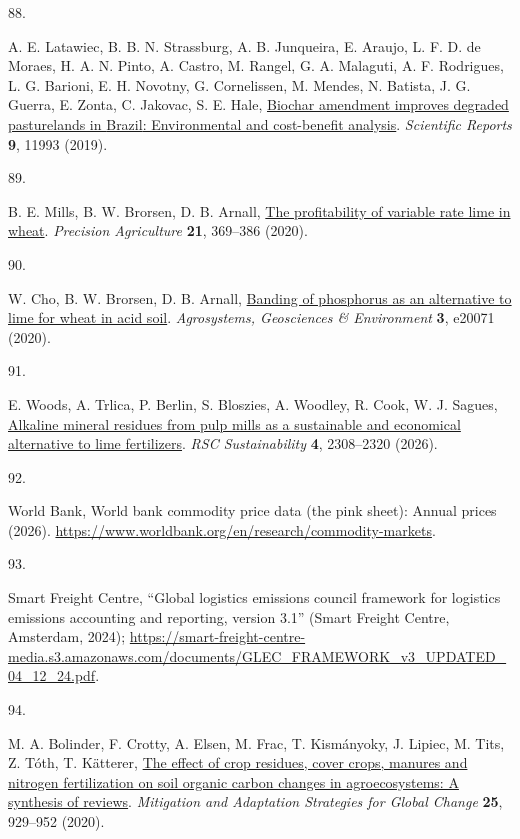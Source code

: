 \documentclass[
  letterpaper,
]{article}
\newlength{\cslhangindent}
\newlength{\csllabelwidth}
\newenvironment{CSLReferences}[2] %
 {\begin{list}{}{%
  \setlength{\itemindent}{0pt}
  \setlength{\leftmargin}{0pt}
  \setlength{\parsep}{0pt}
  \ifodd #1
   \setlength{\leftmargin}{\cslhangindent}
   \setlength{\itemindent}{-1\cslhangindent}
  \fi
  \setlength{\itemsep}{#2\baselineskip}}}
 {\end{list}}
\newcommand{\CSLLeftMargin}[1]{\parbox[t]{\csllabelwidth}{\strut#1\strut}}
\newcommand{\CSLRightInline}[1]{\parbox[t]{\linewidth - \csllabelwidth}{\strut#1\strut}}
\begin{document}
\begin{CSLReferences}{0}{1}
\CSLLeftMargin{88. }%
\CSLRightInline{A. E. Latawiec, B. B. N. Strassburg, A. B. Junqueira, E.
Araujo, L. F. D. de Moraes, H. A. N. Pinto, A. Castro, M. Rangel, G. A.
Malaguti, A. F. Rodrigues, L. G. Barioni, E. H. Novotny, G. Cornelissen,
M. Mendes, N. Batista, J. G. Guerra, E. Zonta, C. Jakovac, S. E. Hale,
\href{https://doi.org/10.1038/s41598-019-47647-x}{Biochar amendment
improves degraded pasturelands in {Brazil}: Environmental and
cost-benefit analysis}. \emph{Scientific Reports} \textbf{9}, 11993
(2019).}

\CSLLeftMargin{89. }%
\CSLRightInline{B. E. Mills, B. W. Brorsen, D. B. Arnall,
\href{https://doi.org/10.1007/s11119-019-09674-6}{The profitability of
variable rate lime in wheat}. \emph{Precision Agriculture} \textbf{21},
369--386 (2020).}

\CSLLeftMargin{90. }%
\CSLRightInline{W. Cho, B. W. Brorsen, D. B. Arnall,
\href{https://doi.org/10.1002/agg2.20071}{Banding of phosphorus as an
alternative to lime for wheat in acid soil}. \emph{Agrosystems,
Geosciences \& Environment} \textbf{3}, e20071 (2020).}

\CSLLeftMargin{91. }%
\CSLRightInline{E. Woods, A. Trlica, P. Berlin, S. Bloszies, A. Woodley,
R. Cook, W. J. Sagues,
\href{https://doi.org/10.1039/d5su00814j}{Alkaline mineral residues from
pulp mills as a sustainable and economical alternative to lime
fertilizers}. \emph{RSC Sustainability} \textbf{4}, 2308--2320 (2026).}

\CSLLeftMargin{92. }%
\CSLRightInline{World Bank, World bank commodity price data (the pink
sheet): Annual prices (2026).
\url{https://www.worldbank.org/en/research/commodity-markets}.}

\CSLLeftMargin{93. }%
\CSLRightInline{Smart Freight Centre, {``Global logistics emissions
council framework for logistics emissions accounting and reporting,
version 3.1''} (Smart Freight Centre, Amsterdam, 2024);
\url{https://smart-freight-centre-media.s3.amazonaws.com/documents/GLEC_FRAMEWORK_v3_UPDATED_04_12_24.pdf}.}

\CSLLeftMargin{94. }%
\CSLRightInline{M. A. Bolinder, F. Crotty, A. Elsen, M. Frac, T.
Kismányoky, J. Lipiec, M. Tits, Z. Tóth, T. Kätterer,
\href{https://doi.org/10.1007/s11027-020-09916-3}{The effect of crop
residues, cover crops, manures and nitrogen fertilization on soil
organic carbon changes in agroecosystems: A synthesis of reviews}.
\emph{Mitigation and Adaptation Strategies for Global Change}
\textbf{25}, 929--952 (2020).}


\end{CSLReferences}
\end{document}
